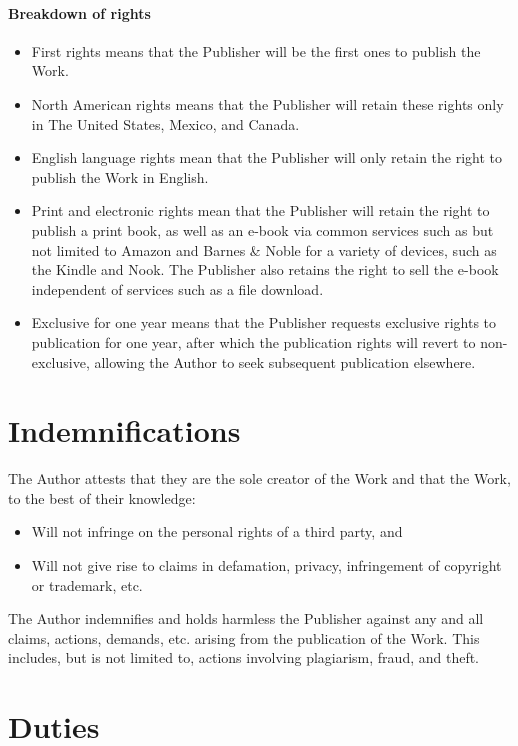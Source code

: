 \documentclass[12pt,letterpaper]{article}
\begin{document}
\paragraph{Breakdown of rights}

\begin{itemize}
    \item First rights means that the Publisher will be the first ones to publish the Work.
    \item North American rights means that the Publisher will retain these rights only in The United States, Mexico, and Canada.
    \item English language rights mean that the Publisher will only retain the right to publish the Work in English.
    \item Print and electronic rights mean that the Publisher will retain the right to publish a print book, as well as an e-book via common services such as but not limited to Amazon and Barnes \& Noble for a variety of devices, such as the Kindle and Nook. The Publisher also retains the right to sell the e-book independent of services such as a file download.
    \item Exclusive for one year means that the Publisher requests exclusive rights to publication for one year, after which the publication rights will revert to non-exclusive, allowing the Author to seek subsequent publication elsewhere.
\end{itemize}

\section{Indemnifications}

The Author attests that they are the sole creator of the Work and that the Work, to the best of their knowledge:

\begin{itemize}
    \item Will not infringe on the personal rights of a third party, and
    \item Will not give rise to claims in defamation, privacy, infringement of copyright or trademark, etc.
\end{itemize}

The Author indemnifies and holds harmless the Publisher against any and all claims, actions, demands, etc. arising from the publication of the Work. This includes, but is not limited to, actions involving plagiarism, fraud, and theft.

\section{Duties}
\end{document}
